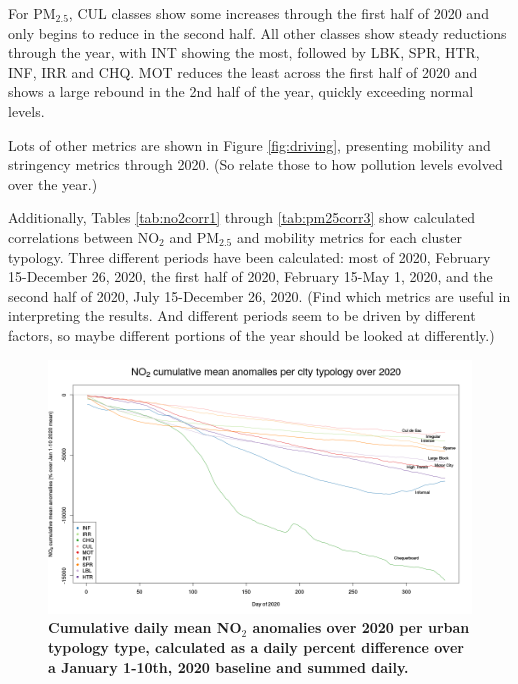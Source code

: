 \documentclass[preprint,12pt]{elsarticle}
\begin{document}
For PM$_{2.5}$, CUL classes show some increases through the first half of 2020 and only begins to reduce in the second half. All other classes show steady reductions through the year, with INT showing the most, followed by LBK, SPR, HTR, INF, IRR and CHQ. MOT reduces the least across the first half of 2020 and shows a large rebound in the 2nd half of the year, quickly exceeding normal levels.

Lots of other metrics are shown in Figure \ref{fig:driving}, presenting mobility and stringency metrics through 2020. (So relate those to how pollution levels evolved over the year.)

Additionally, Tables \ref{tab:no2corr1} through \ref{tab:pm25corr3} show calculated correlations between NO$_{2}$ and PM$_{2.5}$ and mobility metrics for each cluster typology. Three different periods have been calculated: most of 2020, February 15-December 26, 2020, the first half of 2020, February 15-May 1, 2020, and the second half of 2020, July 15-December 26, 2020. (Find which metrics are useful in interpreting the results. And different periods seem to be driven by different factors, so maybe different portions of the year should be looked at differently.)


\begin{figure}
\centering
\includegraphics[trim={0 19 22 43},clip,scale=0.45]{Images/no2CulmReductionClusterMean_2020.png}
\caption{\bf Cumulative daily mean NO$_{2}$ anomalies over 2020 per urban typology type, calculated as a daily percent difference over a January 1-10th, 2020 baseline and summed daily. }
 \label{fig:no2}
\end{figure}
\end{document}
